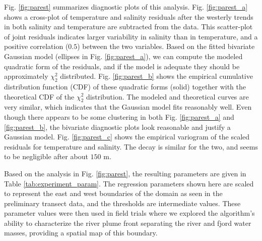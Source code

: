 \documentclass[aoas]{imsart}
\begin{document}
Fig. \ref{fig:parest} summarizes diagnostic plots of this
analysis. Fig. \ref{fig:parest_a} shows a cross-plot of temperature
and salinity residuals after the westerly trends in both salinity and
temperature are subtracted from the data. This scatter-plot of joint
residuals indicates larger variability in salinity than in
temperature, and a positive correlation ($0.5$) between the two
variables. Based on the fitted bivariate Gaussian model (ellipses in
Fig. \ref{fig:parest_a}), we can compute the modeled quadratic form of
the residuals, and if the model is adequate they should be
approximately $\chi^2_2$ distributed. Fig. \ref{fig:parest_b} shows
the empirical cumulative distribution function (CDF) of these
quadratic forms (solid) together with the theoretical CDF of the
$\chi^2_2$ distribution. The modeled and theoretical curves are very
similar, which indicates that the Gaussian model fits reasonably
well. Even though there appears to be some clustering in both
Fig. \ref{fig:parest_a} and \ref{fig:parest_b}, the bivariate
diagnostic plots look reasonable and justify a Gaussian
model. Fig. \ref{fig:parest_c} shows the empirical variogram of the
scaled residuals for temperature and salinity. The decay is similar
for the two, and seems to be negligible after about $150$ m.


Based on the analysis in Fig. \ref{fig:parest}, the resulting
parameters are given in Table \ref{tab:experiment_param}. The
regression parameters shown here are scaled to represent the east and
west boundaries of the domain as seen in the preliminary transect
data, and the thresholds are intermediate values. These parameter
values were then used in field trials where we explored the
algorithm's ability to characterize the river plume front separating
the river and fjord water masses, providing a spatial map of this
boundary.

\end{document}
